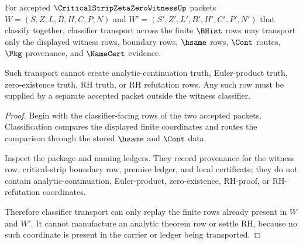 \begin{theorem}
\label{thm:critical-strip-zeta-zero-witness-classifier-nonescape}
For accepted $\CriticalStripZetaZeroWitnessUp$ packets $W=(S,Z,L,B,H,C,P,N)$ and $W'=(S',Z',L',B',H',C',P',N')$ that classify together, classifier transport across the finite $\BHist$ rows may transport only the displayed witness rows, boundary rows, $\hsame$ rows, $\Cont$ routes, $\Pkg$ provenance, and $\NameCert$ evidence.

Such transport cannot create analytic-continuation truth, Euler-product truth, zero-existence truth, RH truth, or RH refutation rows. Any such row must be supplied by a separate accepted packet outside the witness classifier.
\end{theorem}
\begin{proof}
Begin with the classifier-facing rows of the two accepted packets. Classification compares the displayed finite coordinates and routes the comparison through the stored $\hsame$ and $\Cont$ data.

Inspect the package and naming ledgers. They record provenance for the witness row, critical-strip boundary row, premise ledger, and local certificate; they do not contain analytic-continuation, Euler-product, zero-existence, RH-proof, or RH-refutation coordinates.

Therefore classifier transport can only replay the finite rows already present in $W$ and $W'$. It cannot manufacture an analytic theorem row or settle RH, because no such coordinate is present in the carrier or ledger being transported.
\end{proof}

